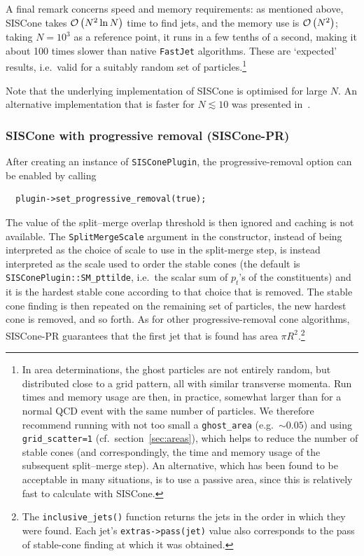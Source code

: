 \documentclass[12pt,a4]{article}
\newcommand{\fastjet}{\texttt{FastJet}\xspace}
\newcommand{\ttt}[1]{{\small\texttt{#1}}}
\newcommand{\order}[1]{{\cal O}\left(#1\right)}
\begin{document}
A final remark concerns speed and memory requirements: as mentioned
above, SISCone takes $\order{N^2 \ln N}$ time to find jets, and the
memory use is $\order{N^2}$; taking $N=10^3$ as a reference point, it
runs in a few tenths of a second, making it about 100 times slower
than native \fastjet algorithms.
%
These are `expected' results, i.e.\ valid for a suitably random set of
particles.\footnote{%
  In area determinations, the ghost particles are not entirely random,
  but distributed close to a grid pattern, all with similar transverse
  momenta.
  Run times and memory usage are then, in practice, somewhat larger
  than for a normal QCD event with the same number of particles.  
  We therefore recommend running with not too small a
  \texttt{ghost\_area} (e.g.\ $\sim 0.05$) and using
  \texttt{grid\_scatter=1} (cf.\ section~\ref{sec:areas}), which helps
  to reduce the number of stable cones (and correspondingly, the time
  and memory usage of the subsequent split--merge step). 
  An alternative, which has been found to be acceptable in many
  situations, is to use a passive area, since this is relatively fast
  to calculate with SISCone.
}


Note that the underlying implementation of SISCone is optimised for
large $N$.
%
An alternative implementation that is faster for $N \lesssim 10$ was
presented in~\cite{Weinzierl:2011jx}. 

\subsubsection{SISCone with progressive removal (SISCone-PR)}
\label{sec:SISCone-PR}

After creating an instance of \ttt{SISConePlugin}, the
progressive-removal option can be enabled by calling
\begin{lstlisting}
  plugin->set_progressive_removal(true);
\end{lstlisting}
The value of the split--merge overlap threshold is then ignored and
caching is not available.
%
The \ttt{SplitMergeScale} argument in the constructor, instead of
being interpreted as the choice of scale to use in the split-merge step,
is instead interpreted as the scale used to order the stable cones (the
default is \ttt{SISConePlugin::SM\_pttilde}, i.e.\ the scalar sum of
$p_t$'s of the constituents) and it is the hardest stable cone
according to that choice that is removed.
%
The stable cone finding is then repeated on the remaining set of
particles, the new hardest cone is removed, and so forth.
%
As for other progressive-removal cone algorithms, SISCone-PR
guarantees that the first jet that is found has area $\pi
R^2$.\footnote{The \texttt{inclusive\_jets()} function returns the
  jets in the order in which they were found. Each jet's
  \texttt{extras->pass(jet)} value also corresponds to the pass of
  stable-cone finding at which it was obtained.}
\end{document}
